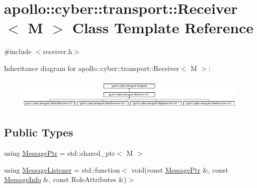 \hypertarget{classapollo_1_1cyber_1_1transport_1_1Receiver}{\section{apollo\-:\-:cyber\-:\-:transport\-:\-:Receiver$<$ M $>$ Class Template Reference}
\label{classapollo_1_1cyber_1_1transport_1_1Receiver}
}


{\ttfamily \#include $<$receiver.\-h$>$}

Inheritance diagram for apollo\-:\-:cyber\-:\-:transport\-:\-:Receiver$<$ M $>$\-:\begin{figure}[H]
\begin{center}
\leavevmode
\includegraphics[height=1.505376cm]{classapollo_1_1cyber_1_1transport_1_1Receiver}
\end{center}
\end{figure}
\subsection*{Public Types}
\begin{DoxyCompactItemize}
\item 
using \hyperlink{classapollo_1_1cyber_1_1transport_1_1Receiver_af02a7bde2d210b5e2e122ba3810933d1}{Message\-Ptr} = std\-::shared\-\_\-ptr$<$ M $>$
\item 
using \hyperlink{classapollo_1_1cyber_1_1transport_1_1Receiver_abd906fd03582b49acbdc81b48a8974aa}{Message\-Listener} = std\-::function$<$ void(const \hyperlink{classapollo_1_1cyber_1_1transport_1_1Receiver_af02a7bde2d210b5e2e122ba3810933d1}{Message\-Ptr} \&, const \hyperlink{classapollo_1_1cyber_1_1transport_1_1MessageInfo}{Message\-Info} \&, const Role\-Attributes \&)$>$
\end{DoxyCompactItemize}
